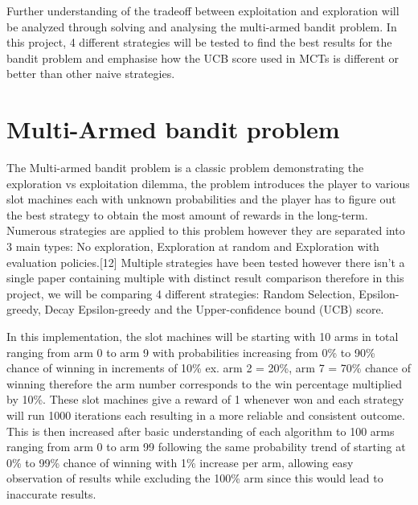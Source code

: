 \documentclass[]{final_report}
\begin{document}
Further understanding of the tradeoff between exploitation and exploration will be analyzed through solving and analysing the multi-armed bandit problem. In this project, 4 different strategies will be tested to find the best results for the bandit problem and emphasise how the UCB score used in MCTs is different or better than other naive strategies. 

\section{Multi-Armed bandit problem}

The Multi-armed bandit problem is a classic problem demonstrating the exploration vs exploitation dilemma, the problem introduces the player to various slot machines each with unknown probabilities and the player has to figure out the best strategy to obtain the most amount of rewards in the long-term. Numerous strategies are applied to this problem however they are separated into 3 main types: No exploration, Exploration at random and Exploration with evaluation policies.[12] Multiple strategies have been tested however there isn’t a single paper containing multiple with distinct result comparison therefore in this project, we will be comparing 4 different strategies: Random Selection, Epsilon-greedy, Decay Epsilon-greedy and the Upper-confidence bound (UCB) score.  

In this implementation,  the slot machines will be starting with 10 arms in total ranging from arm 0 to arm 9 with probabilities increasing from 0\% to 90\% chance of winning in increments of 10\% ex. arm 2 = 20\%, arm 7 = 70\% chance of winning therefore the arm number corresponds to the win percentage multiplied by 10\%. These slot machines give a reward of 1 whenever won and each strategy will run 1000 iterations each resulting in a more reliable and consistent outcome.  This is then increased after basic understanding of each algorithm to 100 arms ranging from arm 0 to arm 99 following the same probability trend of starting at 0\% to 99\% chance of winning with 1\% increase per arm, allowing easy observation of results while excluding the 100\% arm since this would lead to inaccurate results. 
\end{document}
